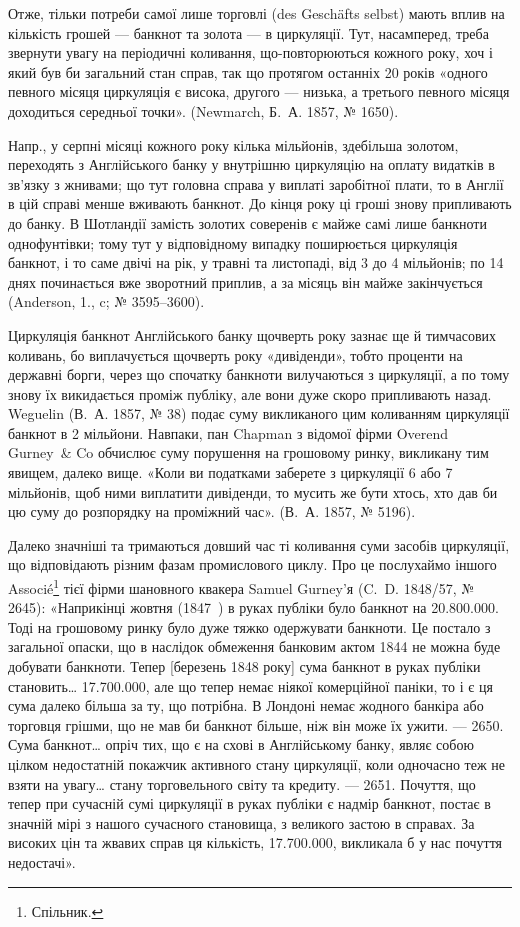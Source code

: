 Отже, тільки потреби самої лише торговлі (des Geschäfts selbst) мають
вплив на кількість грошей — банкнот та золота — в циркуляції. Тут, насамперед,
треба звернути увагу на періодичні коливання, що-повторюються кожного року,
хоч і який був би загальний стан справ, так що протягом останніх 20 років
«одного певного місяця циркуляція є висока, другого — низька, а третього певного
місяця доходиться середньої точки». (Newmarch, Б.~А. 1857, № 1650).

Напр., у серпні місяці кожного року кілька мільйонів, здебільша золотом,
переходять з Англійського банку у внутрішню циркуляцію на оплату видатків
в зв’язку з жнивами; що тут головна справа у виплаті заробітної плати, то
в Англії в цій справі менше вживають банкнот. До кінця року ці гроші знову
припливають до банку. В Шотландії замість золотих соверенів є майже самі лише
банкноти однофунтівки; тому тут у відповідному випадку поширюється циркуляція
банкнот, і то саме двічі на рік, у травні та листопаді, від 3 до 4 мільйонів;
по 14 днях починається вже зворотний приплив, а за місяць він майже закінчується
(Anderson, 1., c; № 3595--3600).

Циркуляція банкнот Англійського банку щочверть року зазнає ще й
тимчасових коливань, бо виплачується щочверть року «дивіденди», тобто проценти
на державні борги, через що спочатку банкноти вилучаються з циркуляції,
а по тому знову їх викидається проміж публіку, але вони дуже скоро припливають
назад. Weguelin (В.~А. 1857, № 38) подає суму викликаного цим коливанням
циркуляції банкнот в 2 мільйони. Навпаки, пан Chapman з відомої фірми
Overend Gurney~\& Co обчислює суму порушення на грошовому ринку, викликану
тим явищем, далеко вище. «Коли ви податками заберете з циркуляції 6 або
7 мільйонів, щоб ними виплатити дивіденди, то мусить же бути хтось, хто дав
би цю суму до розпорядку на проміжний час». (В.~А. 1857, № 5196).

Далеко значніші та тримаються довший час ті коливання суми засобів
циркуляції, що відповідають різним фазам промислового циклу. Про це послухаймо
іншого Associé\footnote*{
Спільник. 
} тієї фірми шановного квакера Samuel Gurney’я (C.~D.
1848/57, № 2645): «Наприкінці жовтня (1847~) в руках публіки було банкнот
на \num{20.800.000}. Тоді на грошовому ринку було дуже тяжко одержувати
банкноти. Це постало з загальної опаски, що в наслідок обмеження банковим
актом 1844 не можна буде добувати банкноти. Тепер [березень 1848 року] сума
банкнот в руках публіки становить\dots{} \num{17.700.000}, але що тепер немає
ніякої комерційної паніки, то і є ця сума далеко більша за ту, що потрібна.
В Лондоні немає жодного банкіра або торговця грішми, що не мав би банкнот
більше, ніж він може їх ужити. — 2650. Сума банкнот\dots{} опріч тих, що є на
схові в Англійському банку, являє собою цілком недостатній покажчик активного
стану циркуляції, коли одночасно теж не взяти на увагу\dots{} стану торговельного
світу та кредиту. — 2651. Почуття, що тепер при сучасній сумі циркуляції в
руках публіки є надмір банкнот, постає в значній мірі з нашого сучасного становища,
з великого застою в справах. За високих цін та жвавих справ ця
кількість, \num{17.700.000}, викликала б у нас почуття недостачі».

